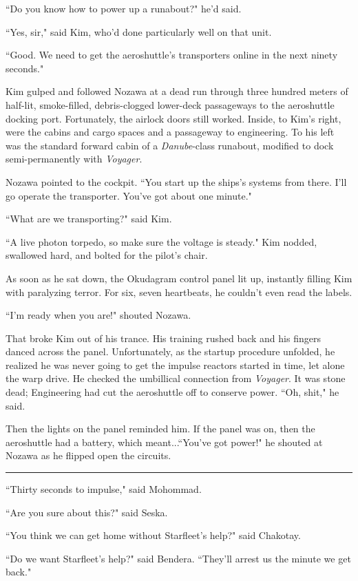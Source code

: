 \documentclass[twoside,letterpaper,12pt]{memoir}
\begin{document}
``Do you know how to power up a runabout?" he'd said.

``Yes, sir," said Kim, who'd done particularly well on that unit.

``Good. We need to get the aeroshuttle's transporters online in the next ninety seconds."

Kim gulped and followed Nozawa at a dead run through three hundred meters of half-lit, smoke-filled, debris-clogged lower-deck passageways to the aeroshuttle docking port. Fortunately, the airlock doors still worked. Inside, to Kim's right, were the cabins and cargo spaces and a passageway to engineering. To his left was the standard forward cabin of a \textit{Danube}-class runabout, modified to dock semi-permanently with \textit{Voyager}.

Nozawa pointed to the cockpit. ``You start up the ships's systems from there. I'll go operate the transporter. You've got about one minute."

``What are we transporting?" said Kim.

``A live photon torpedo, so make sure the voltage is steady." Kim nodded, swallowed hard, and bolted for the pilot's chair.

As soon as he sat down, the Okudagram control panel lit up, instantly filling Kim with paralyzing terror. For six, seven heartbeats, he couldn't even read the labels.

``I'm ready when you are!" shouted Nozawa.

That broke Kim out of his trance. His training rushed back and his fingers danced across the panel. Unfortunately, as the startup procedure unfolded, he realized he was never going to get the impulse reactors started in time, let alone the warp drive. He checked the umbillical connection from \textit{Voyager}. It was stone dead; Engineering had cut the aeroshuttle off to conserve power. ``Oh, shit," he said.

Then the lights on the panel reminded him. If the panel was on, then the aeroshuttle had a battery, which meant...``You've got power!" he shouted at Nozawa as he flipped open the circuits.

\fancybreak{\rule{3cm}{0.4 pt}}
``Thirty seconds to impulse," said Mohommad.

``Are you sure about this?" said Seska.

``You think we can get home without Starfleet's help?" said Chakotay.

``Do we want Starfleet's help?" said Bendera. ``They'll arrest us the minute we get back."
\end{document}
